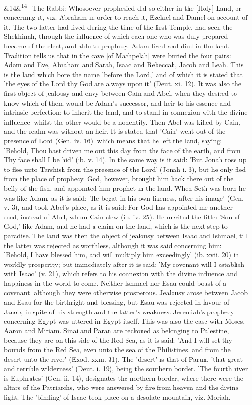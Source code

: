 \documentclass[12pt]{article}
\newcommand{\para}[1][]{\par\noindent\ifx&#1&\else\textsuperscript{\footnotesize #1}~\fi}
\begin{document}
\para[14] The Rabbi: Whosoever prophesied did so either in the [Holy] Land, or concerning it, viz. Abraham in order to reach it, Ezekiel and Daniel on account of it. The two latter had lived during the time of the first Temple, had seen the Shekhinah, through the influence of which each one who was duly prepared became of the elect, and able to prophesy. Adam lived and died in the land. Tradition tells us that in the cave [of Machpelāh] were buried the four pairs: Adam and Eve, Abraham and Sarah, Isaac and Rebeccah, Jacob and Leah. This is the land which bore the name 'before the Lord,' and of which it is stated that 'the eyes of the Lord thy God are always upon it' (Deut. xi. 12). It was also the first object of jealousy and envy between Cain and Abel, when they desired to know which of them would be Adam's successor, and heir to his essence and intrinsic perfection; to inherit the land, and to stand in connexion with the divine influence, whilst the other would be a nonentity. Then Abel was killed by Cain, and the realm was without an heir. It is stated that 'Cain' went out of the presence of Lord (Gen. iv. 16), which means that he left the land, saying: 'Behold, Thou hast driven me out this day from the face of the earth, and from Thy face shall I be hid' (ib. v. 14). In the same way is it said: 'But Jonah rose up to flee unto Tarshish from the presence of the Lord' (Jonah i. 3), but he only fled from the place of prophecy. God, however, brought him back there out of the belly of the fish, and appointed him prophet in the land. When Seth was born he was like Adam, as it is said: 'He begat in his own likeness, after his image' (Gen. v. 3), and took Abel's place, as it is said: For God has appointed me another seed, instead of Abel, whom Cain slew (ib. iv. 25). He merited the title: 'Son of God,' like Adam, and he had a claim on the land, which is the next step to paradise. The land was then the object of jealousy between Isaac and Ishmael, till the latter was rejected as worthless, although it was said concerning him: 'Behold, I have blessed him, and will multiply him exceedingly' (ib. xvii. 20) in worldly prosperity; but immediately after it is said: 'My covenant will I establish with Isaac' (v. 21), which refers to his connexion with the divine influence and happiness in the world to come. Neither Ishmael nor Esau could boast of a covenant, although they were otherwise prosperous. Jealousy arose between Jacob and Esau for the birthright and blessing, but Esau was rejected in favour of Jacob, in spite of his strength and the latter's weakness. Jeremiah's prophecy concerning Egypt was uttered in Egypt itself. This was also the case with Moses, Aaron and Miriam. Sinai and Parān are reckoned as belonging to Palestine, because they are on this side of the Red Sea, as it is said: 'And I will set thy bounds from the Red Sea, even unto the sea of the Philistines, and from the desert unto the river' (Exod. xxiii. 31). The 'desert' is that of Parūn, 'that great and terrible wilderness' (Deut. i. 19), being the southern border. 'The fourth river is Euphrates' (Gen. ii. 14), designates the northern border, where there were the altars of the Patriarchs, who were answered by fire from heaven and the divine light. The 'binding' of Isaac took place on a desolate mountain, viz. Moriah. 
\end{document}
